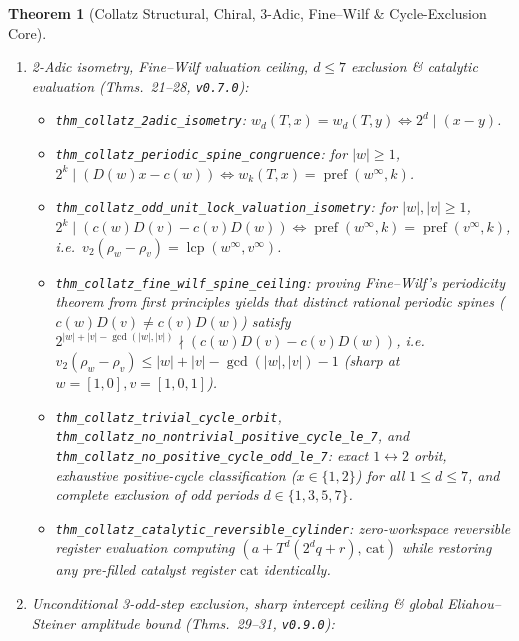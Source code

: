 \documentclass[11pt,reqno]{amsart}
\theoremstyle{plain}
\newtheorem{theorem}{Theorem}[section]
\theoremstyle{definition}
\newcommand{\code}[1]{{\upshape\nolinkurl{#1}}}
\begin{document}
\begin{theorem}[Collatz Structural, Chiral, 3-Adic, Fine--Wilf \& Cycle-Exclusion Core]
\begin{enumerate}
\begin{itemize}
        (since $(2^d - 3)x = 2^a$ with $2^d - 3$ odd forces $2^d - 3 = 1$).
      \item \code{thm_collatz_positive_cycle_two_odd}: $o(T,d,x) = 2 \implies d = 4 \land x \in \{1, 2\}$
        (since $(2^d - 9)x = 2^a(3 + 2^m)$ with $1 \le m \le d-1$ and $2^d - 9$ odd forces $2^d - 9 \mid 3 + 2^m$, impossible for $d \ge 5$ as $2^d - 9 > 3 + 2^{d-1}$, leaving $d=4, m=2$).
    \end{itemize}
  \item \emph{2-Adic isometry, Fine--Wilf valuation ceiling, $d \le 7$ exclusion \& catalytic evaluation (Thms.~21--28, \texttt{v0.7.0}):}
    \begin{itemize}
      \item {\small\code{thm_collatz_2adic_isometry}}: $w_d(T, x) = w_d(T, y) \iff 2^d \mid (x - y)$.
      \item {\small\code{thm_collatz_periodic_spine_congruence}}: for $|w| \ge 1$, $2^k \mid (D(w)x - c(w)) \iff w_k(T, x) = \operatorname{pref}(w^\infty, k)$.
      \item {\small\code{thm_collatz_odd_unit_lock_valuation_isometry}}: for $|w|,|v| \ge 1$, $2^k \mid (c(w)D(v) - c(v)D(w)) \iff \operatorname{pref}(w^\infty, k) = \operatorname{pref}(v^\infty, k)$, i.e.\ $v_2(\rho_w - \rho_v) = \operatorname{lcp}(w^\infty, v^\infty)$.
      \item {\small\code{thm_collatz_fine_wilf_spine_ceiling}}: proving Fine--Wilf's periodicity theorem \cite{finewilf1965} from first principles yields that distinct rational periodic spines ($c(w)D(v) \ne c(v)D(w)$) satisfy $2^{|w|+|v|-\gcd(|w|,|v|)} \nmid (c(w)D(v) - c(v)D(w))$, i.e.\ $v_2(\rho_w - \rho_v) \le |w|+|v|-\gcd(|w|,|v|)-1$ (sharp at $w = [1,0], v = [1,0,1]$).
      \item {\small\code{thm_collatz_trivial_cycle_orbit}}, {\small\code{thm_collatz_no_nontrivial_positive_cycle_le_7}}, and {\small\code{thm_collatz_no_positive_cycle_odd_le_7}}: exact $1 \leftrightarrow 2$ orbit, exhaustive positive-cycle classification ($x \in \{1,2\}$) for all $1 \le d \le 7$, and complete exclusion of odd periods $d \in \{1,3,5,7\}$.
      \item {\small\code{thm_collatz_catalytic_reversible_cylinder}}: zero-workspace reversible register evaluation \cite{buhrman2014catalytic} computing $(a + T^d(2^d q + r),\, \mathrm{cat})$ while restoring any pre-filled catalyst register $\mathrm{cat}$ identically.
    \end{itemize}
  \item \emph{Unconditional 3-odd-step exclusion, sharp intercept ceiling \& global Eliahou--Steiner amplitude bound (Thms.~29--31, \texttt{v0.9.0}):}

\end{enumerate}
\end{theorem}
\end{document}

